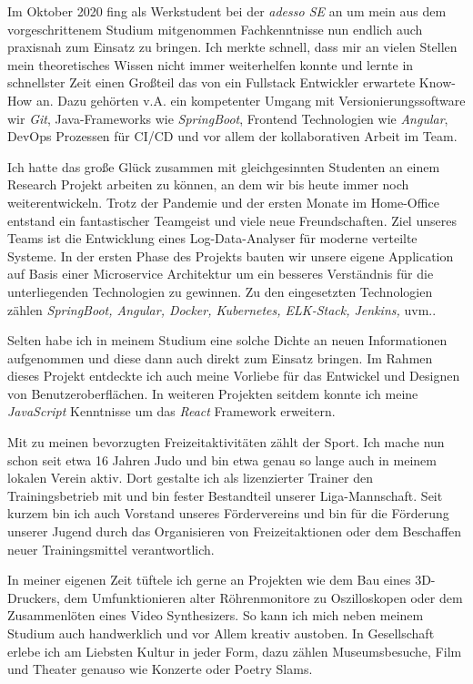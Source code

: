\documentclass[11pt, a4paper]{awesome-cv}
\begin{document}
\begin{cvletter}
  Im Oktober 2020 fing als Werkstudent bei der \textit{adesso SE} an um mein aus dem vorgeschrittenem Studium mitgenommen Fachkenntnisse nun endlich auch praxisnah zum Einsatz zu bringen. Ich merkte schnell, dass mir an vielen Stellen mein theoretisches Wissen nicht immer weiterhelfen konnte und lernte in schnellster Zeit einen Großteil das von ein Fullstack Entwickler erwartete Know-How an. Dazu gehörten v.A. ein kompetenter Umgang mit Versionierungssoftware wir \textit{Git}, Java-Frameworks wie \textit{SpringBoot}, Frontend Technologien wie \textit{Angular}, DevOps Prozessen für CI/CD und vor allem der kollaborativen Arbeit im Team.

  Ich hatte das große Glück zusammen mit gleichgesinnten Studenten an einem Research Projekt arbeiten zu können, an dem wir bis heute immer noch weiterentwickeln. Trotz der Pandemie und der ersten Monate im Home-Office entstand ein fantastischer Teamgeist und viele neue Freundschaften. Ziel unseres Teams ist die Entwicklung eines Log-Data-Analyser für moderne verteilte Systeme. In der ersten Phase des Projekts bauten wir unsere eigene Application auf Basis einer Microservice Architektur um ein besseres Verständnis für die unterliegenden Technologien zu gewinnen. Zu den eingesetzten Technologien zählen \textit{SpringBoot, Angular, Docker, Kubernetes, ELK-Stack, Jenkins,} uvm..

  Selten habe ich in meinem Studium eine solche Dichte an neuen Informationen aufgenommen und diese dann auch direkt zum Einsatz bringen. Im Rahmen dieses Projekt entdeckte ich auch meine Vorliebe für das Entwickel und Designen von Benutzeroberflächen. In weiteren Projekten seitdem konnte ich meine \textit{JavaScript} Kenntnisse um das \textit{React} Framework erweitern.


  Mit zu meinen bevorzugten Freizeitaktivitäten zählt der Sport. Ich mache nun schon seit etwa 16 Jahren Judo und bin etwa genau so lange auch in meinem lokalen Verein aktiv. Dort gestalte ich als lizenzierter Trainer den Trainingsbetrieb mit und bin fester Bestandteil unserer Liga-Mannschaft. Seit kurzem bin ich auch Vorstand unseres Fördervereins und bin für die Förderung unserer Jugend durch das Organisieren von Freizeitaktionen oder dem Beschaffen neuer Trainingsmittel verantwortlich.

  In meiner eigenen Zeit tüftele ich gerne an Projekten wie dem Bau eines 3D-Druckers, dem Umfunktionieren alter Röhrenmonitore zu Oszilloskopen oder dem Zusammenlöten eines Video Synthesizers. So kann ich mich neben meinem Studium auch handwerklich und vor Allem kreativ austoben. In Gesellschaft erlebe ich am Liebsten Kultur in jeder Form, dazu zählen Museumsbesuche, Film und Theater genauso wie Konzerte oder Poetry Slams.


\end{cvletter}
\end{document}
